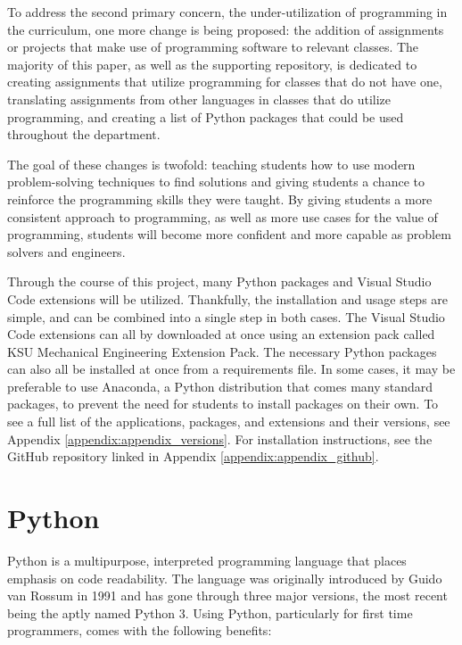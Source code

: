 To address the second primary concern, the under-utilization of programming in the curriculum, one more
change is being proposed: the addition of assignments or projects that make use of programming software
to relevant classes. The majority of this paper, as
well as the supporting repository, is dedicated to creating assignments that utilize programming for classes
that do not have one, translating assignments from other languages in classes that do utilize programming,
and creating a list of Python packages that could be used throughout the department.

The goal of these changes is twofold: teaching students how to use modern problem-solving techniques to find 
solutions and giving students a chance to reinforce the programming skills they were taught. By giving
students a more consistent approach to programming, as well as more use cases for the value of programming,
students will become more confident and more capable as problem solvers and engineers.

Through the course of this project, many Python packages and Visual Studio Code extensions will
be utilized. Thankfully, the installation and usage steps are simple, and can be combined into a single 
step in both cases. The Visual Studio Code extensions can all by downloaded at once using an
extension pack called KSU Mechanical Engineering Extension Pack. The necessary Python packages can also
all be installed at once from a requirements file. In some cases, it may be preferable to use Anaconda,
a Python distribution that comes many standard packages, to prevent the need for students to install
packages on their own. To see a full list of the applications, packages, and extensions and their versions, 
see Appendix \ref{appendix:appendix_versions}. For installation instructions, see the GitHub repository linked 
in Appendix \ref{appendix:appendix_github}. 

\section{Python}

Python is a multipurpose, interpreted programming language that places emphasis on code readability. The language
was originally introduced by Guido van Rossum in 1991 and has gone through three major versions,
the most recent being the aptly named Python 3. Using Python, particularly for first time programmers,
comes with the following benefits:

